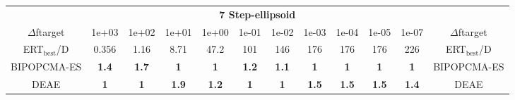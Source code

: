 \begin{tabular}{cccccccccccc}
 & \multicolumn{10}{c}{{\normalsize \textbf{7 Step-ellipsoid}}}\\
$\Delta$ftarget& 1e+03& 1e+02& 1e+01& 1e+00& 1e-01& 1e-02& 1e-03& 1e-04& 1e-05& 1e-07 & $\Delta$ftarget \\
ERT$_{\textrm{best}}$/D& 0.356& 1.16& 8.71& 47.2& 101& 146& 176& 176& 176& 226 & ERT$_{\textrm{best}}$/D \\
\hline
BIPOPCMA-ES & \textbf{1.4} & \textbf{1.7} & \textbf{1} & \textbf{1} & \textbf{1.2} & \textbf{1.1} & \textbf{1} & \textbf{1} & \textbf{1} & \textbf{1} & BIPOPCMA-ES \cite{add_an_entry_for_BIPOPCMA-ES_in_bbob.bib}\\
DEAE & \textbf{1} & \textbf{1} & \textbf{1.9} & \textbf{1.2} & \textbf{1} & \textbf{1} & \textbf{1.5} & \textbf{1.5} & \textbf{1.5} & \textbf{1.4} & DEAE \cite{add_an_entry_for_DEAE_in_bbob.bib}
\end{tabular}
